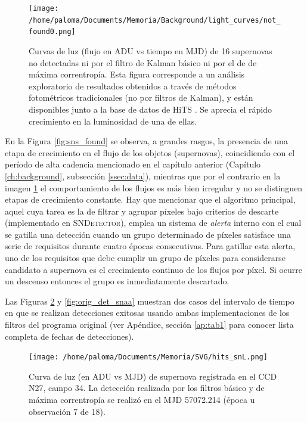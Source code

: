 \begin{figure}[h!]
\centering
\texttt{[image: /home/paloma/Documents/Memoria/Background/light\_curves/not\_found0.png]}
\caption{Curvas de luz (flujo en ADU vs tiempo en MJD) de 16 supernovas no detectadas ni por el filtro de Kalman b\'asico ni por el de de m\'axima correntrop\'ia. Esta figura corresponde a un an\'alisis exploratorio de resultados obtenidos a trav\'es de m\'etodos fotom\'etricos tradicionales (no por filtros de Kalman), y est\'an disponibles junto a la base de datos de HiTS \cite{hits}. Se aprecia el r\'apido crecimiento en la luminosidad de una de ellas.}
\label{fig:sns_not_found}
\end{figure}

En la Figura \ref{fig:sns_found} se observa, a grandes rasgos, la presencia de una etapa de crecimiento en el flujo de los objetos (supernovas), coincidiendo con el per\'iodo de alta cadencia mencionado en el cap\'itulo anterior (Cap\'itulo \ref{ch:background}, subsecci\'on \ref{ssec:data}), mientras que por el contrario en la imagen \ref{fig:sns_not_found} el comportamiento de los flujos es m\'as bien irregular y no se distinguen etapas de crecimiento constante. Hay que mencionar que el algoritmo principal, aquel cuya tarea es la de filtrar y agrupar p\'ixeles bajo criterios de descarte (implementado en \textsc{SNDetector}), emplea un sistema de \textit{alerta} interno con el cual se gatilla una detecci\'on cuando un grupo determinado de p\'ixeles satisface una serie de requisitos durante cuatro \'epocas consecutivas. Para gatillar esta alerta, uno de los requisitos que debe cumplir un grupo de p\'ixeles para considerarse candidato a supernova es el crecimiento continuo de los flujos por p\'ixel. Si ocurre un descenso entonces el grupo es inmediatamente descartado.  
\bigskip

Las Figuras \ref{fig:orig_det_snL} y \ref{fig:orig_det_snaa} muestran dos casos del intervalo de tiempo en que se realizan detecciones exitosas usando ambas implementaciones de los filtros del programa original (ver Ap\'endice, secci\'on \ref{ap:tab1} para conocer lista completa de fechas de detecciones).
\bigskip

\begin{figure}[h!]
\centering
\texttt{[image: /home/paloma/Documents/Memoria/SVG/hits\_snL.png]}
\caption{Curva de luz (en ADU vs MJD) de supernova registrada en el CCD N27, campo 34. La detecci\'on realizada por los filtros b\'asico y de m\'axima correntrop\'ia se realiz\'o en el MJD 57072.214 (\'epoca u observaci\'on 7 de 18). }
\label{fig:orig_det_snL}
\end{figure}


